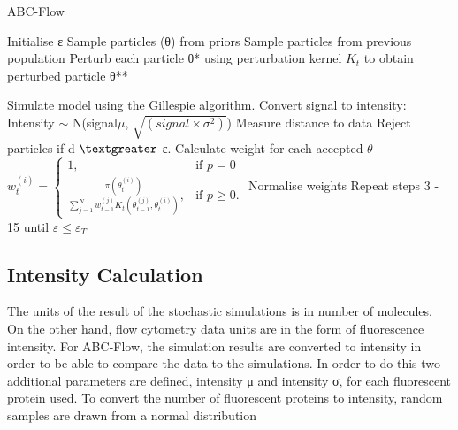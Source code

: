 \begin{algorithm}[htbp]

\caption{ABC-Flow}
\label{alg:abc-flow}
 \begin{algorithmic}[1]
 	\Statex
 	
	\State Initialise ε
		\State Sample particles (θ) from priors
		\Else
			\State Sample particles from previous population
			\State Perturb each particle θ* using perturbation kernel $K_t$ to obtain perturbed particle θ** %

	\EndIf
	\State Simulate model using the Gillespie algorithm.
	\State Convert signal to intensity: 
					\State Intensity $\sim$ N\bigg(signal\times$\mu$,  $\sqrt{(signal\times\sigma^2)}$\bigg)
	\EndFor				
	\EndFor	
	\EndFor	
	\EndFor	
	\State Measure distance to data
	\State Reject particles if d $\textgreater$ ε.
    \State Calculate weight for each accepted $\theta$
	\State $w_{t}^{(i)} = \begin{cases} 1, & \mbox{if } p = 0 \\\frac{\pi(\theta_{t}^{(i)})}{\sum_{j=1}^N w_{t-1}^{(j)} K_{t}(\theta_{t-1}^{(j)}, \theta_{t}^{(i)})}, & \mbox{if } p \geq  0. \end{cases}$
	\State Normalise weights
	\State Repeat steps 3 - 15 until $ε \leq ε_T$	%
  \end{algorithmic}
\end{algorithm}
\clearpage
\subsection{Intensity Calculation}

The units of the result of the stochastic simulations is in number of molecules. On the other hand, flow cytometry data units are in the form of fluorescence intensity. For ABC-Flow, the simulation results are converted to intensity in order to be able to compare the data to the simulations. In order to do this two additional parameters are defined, intensity μ and intensity σ, for each fluorescent protein used. To convert the number of fluorescent proteins to intensity, random samples are drawn from a normal distribution

